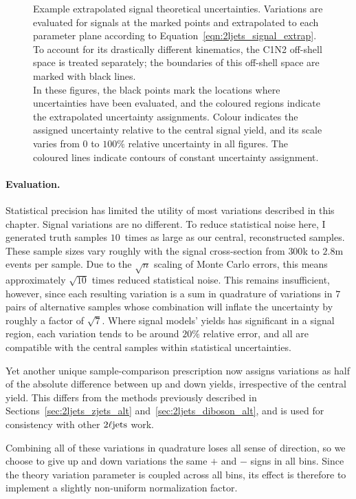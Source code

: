 \begin{figure}[tp]
\caption[
Example extrapolated signal theoretical uncertainties
]{%
Example extrapolated signal theoretical uncertainties.
Variations are evaluated for signals at the marked points and extrapolated to
each parameter plane according to Equation~\ref{eqn:2ljets_signal_extrap}.
To account for its drastically different kinematics, the C1N2 off-shell space
is treated separately;
the boundaries of this off-shell space are marked with black lines.
\\[0.4em]
In these figures, the black points mark the locations where uncertainties have
been evaluated, and the coloured regions indicate the extrapolated
uncertainty assignments.
Colour indicates the assigned uncertainty relative to the central
signal yield, and its scale varies from $0$ to $100\%$ relative uncertainty
in all figures.
The coloured lines indicate contours of constant uncertainty assignment.
}
\label{fig:2ljets_signal_sys_extrap}
\end{figure}

\paragraph{Evaluation.}
Statistical precision has limited the utility of most variations described in
this chapter.
Signal variations are no different.
To reduce statistical noise here, I generated truth samples $10$~times as large
as our central, reconstructed samples.
These sample sizes vary roughly with the signal cross-section from $300$k to
$2.8$m events per sample.
Due to the $\sqrt{n}$ scaling of Monte Carlo errors, this means approximately
$\sqrt{10}$ times reduced statistical noise.
This remains insufficient, however, since each resulting variation is a
sum in quadrature of variations in $7$ pairs of alternative samples
whose combination will inflate the uncertainty by roughly a factor of
$\sqrt{7}$.
Where signal models' yields has significant in a signal region,
each variation tends to be around $20\%$ relative error,
and all are compatible with the central samples within statistical
uncertainties.

Yet another unique sample-comparison prescription now assigns variations as
half of the absolute difference between up and down yields, irrespective of the
central yield.
This differs from the methods previously described in
Sections~\ref{sec:2ljets_zjets_alt} and~\ref{sec:2ljets_diboson_alt},
and is used for consistency with other $2\ell\mathrm{jets}$ work.

Combining all of these variations in quadrature loses all sense of direction,
so we choose to give up and down variations the same $+$ and $-$ signs in all
bins.
Since the theory variation parameter is coupled across all bins, its effect is
therefore to implement a slightly non-uniform normalization factor.

